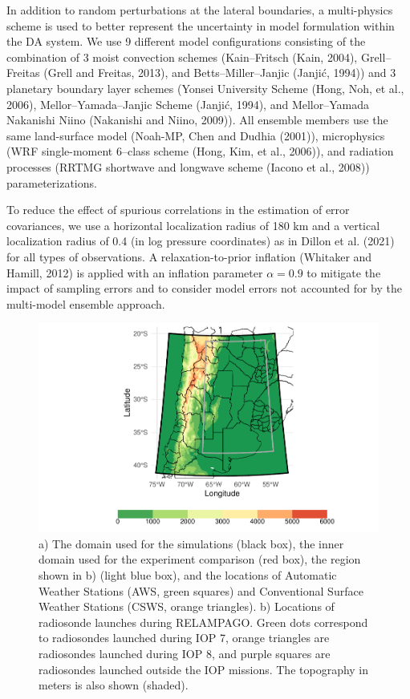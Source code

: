 \documentclass[authoryear,preprint,review,12pt]{elsarticle} %
\begin{document}
In addition to random perturbations at the lateral boundaries, a multi-physics scheme is used to better represent the uncertainty in model formulation within the DA system. We use 9 different model configurations consisting of the combination of 3 moist convection schemes (Kain--Fritsch (Kain, 2004), Grell--Freitas (Grell and Freitas, 2013), and Betts--Miller--Janjic (Janjić, 1994)) and 3 planetary boundary layer schemes (Yonsei University Scheme (Hong, Noh, et al., 2006), Mellor--Yamada--Janjic Scheme (Janjić, 1994), and Mellor--Yamada Nakanishi Niino (Nakanishi and Niino, 2009)). All ensemble members use the same land-surface model (Noah-MP, Chen and Dudhia (2001)), microphysics (WRF single-moment 6--class scheme (Hong, Kim, et al., 2006)), and radiation processes (RRTMG shortwave and longwave scheme (Iacono et al., 2008)) parameterizations.

To reduce the effect of spurious correlations in the estimation of error covariances, we use a horizontal localization radius of 180 km and a vertical localization radius of 0.4 (in log pressure coordinates) as in Dillon et al. (2021) for all types of observations.
A relaxation-to-prior inflation (Whitaker and Hamill, 2012) is applied with an inflation parameter \(\alpha=0.9\) to mitigate the impact of sampling errors and to consider model errors not accounted for by the multi-model ensemble approach.



\begin{figure}
\includegraphics[width=1\linewidth]{../figures/dominio-1} \caption{a) The domain used for the simulations (black box), the inner domain used for the experiment comparison (red box), the region shown in b) (light blue box), and the locations of Automatic Weather Stations (AWS, green squares) and Conventional Surface Weather Stations (CSWS, orange triangles). b) Locations of radiosonde launches during RELAMPAGO. Green dots correspond to radiosondes launched during IOP 7, orange triangles are radiosondes launched during IOP 8, and purple squares are radiosondes launched outside the IOP missions. The topography in meters is also shown (shaded).}\label{fig:dominio}
\end{figure}
\end{document}
